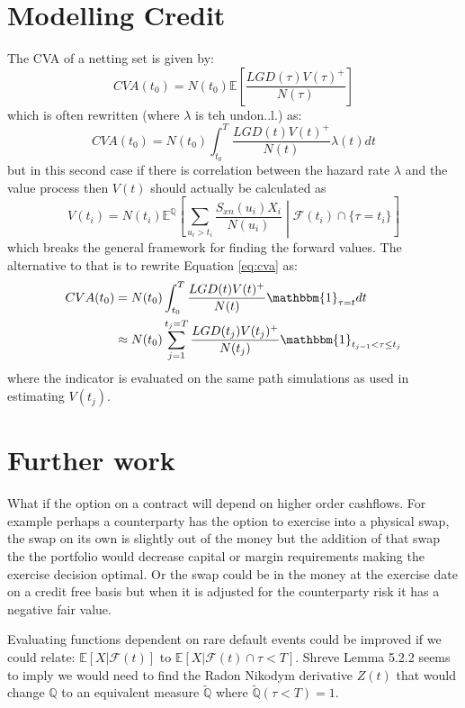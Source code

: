 \documentclass[a4paper,10pt]{article}
\newcommand{\E}{\mathbb{E}}                 %
\newcommand{\Q}{\mathbb{Q}}                 %
\begin{document}
\section{Modelling Credit}
The CVA of a netting set is given by:
\begin{equation}
CVA(t_0) = N(t_0) \E \left[ \frac{LGD(\tau)V(\tau)^+}{N(\tau)}\right]
\label{eq:cva}
\end{equation}
which is often rewritten (where $\lambda$ is teh undon..l.) as:
\begin{equation}
CVA(t_0) = N(t_0) \int_{t_0}^T \frac{LGD(t)V(t)^+}{N(t)} \lambda(t) dt
\end{equation}
but in this second case if there is correlation between the hazard rate $\lambda$ and the value process then $V(t)$
should actually be calculated as 
\begin{equation}
V(t_i) = N(t_i)\E^\Q\left[ \sum_{u_i>t_i}{\frac{S_{xn}(u_i)X_i}{N(u_i)}} \middle| \mathcal{F}(t_i) \cap \{\tau=t_i\} \right]
\end{equation}
which breaks the general framework for finding the forward values.  The alternative to that is to rewrite Equation \ref{eq:cva} as:
\begin{align}
CVA(t_0) &= N(t_0) \int_{t_0}^T \frac{LGD(t)V(t)^+}{N(t)} \mathbbm{1}_{\tau=t} dt\\
&\approx N(t_0) \sum_{j=1}^{t_j=T} \frac{LGD(t_j)V(t_j)^+}{N(t_j)} \mathbbm{1}_{t_{j-1}<\tau \leq t_j}
\label{eq:cva2}
\end{align}
where the indicator is evaluated on the same path simulations as used in estimating $V(t_j)$.

\section{Further work}
What if the option on a contract will depend on higher order cashflows.  For example perhaps a counterparty has the option to exercise into a physical swap, the swap on its own is slightly out of the money but the addition of that swap the the portfolio would decrease capital or margin requirements making the exercise decision optimal.  Or the swap could be in the money at the exercise date on a credit free basis but when it is adjusted for the counterparty risk it has a negative fair value.

Evaluating functions dependent on rare default events could be improved if we could relate: $\E[X|\mathcal{F}(t)]$ to $\E[X|\mathcal{F}(t)\cap \tau<T]$.  Shreve \cite{Shreve} Lemma 5.2.2 seems to imply we would need to find the Radon Nikodym derivative $Z(t)$ that would change $\Q$ to an equivalent measure $\tilde{\Q}$ where $\tilde{\Q}(\tau<T)=1$.
\end{document}
